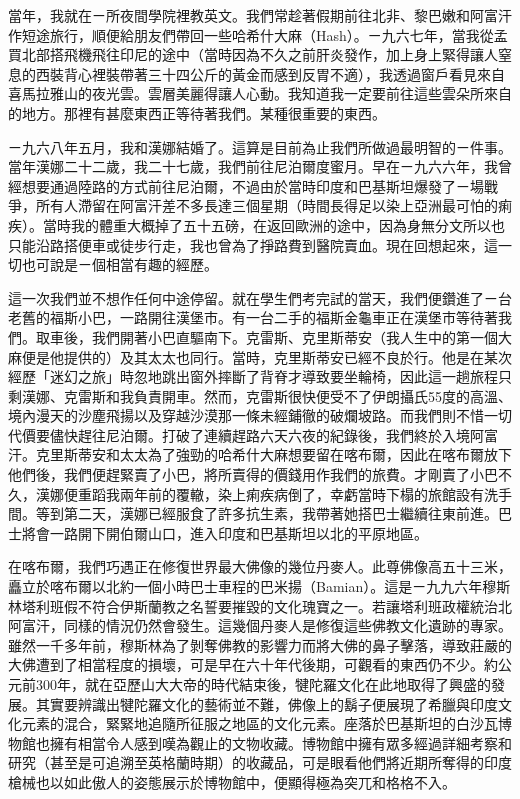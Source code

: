 當年，我就在ㄧ所夜間學院裡教英文。我們常趁著假期前往北非、黎巴嫩和阿富汗作短途旅行，順便給朋友們帶回一些哈希什大麻（Hash）。ㄧ九六七年，當我從孟買北部搭飛機飛往印尼的途中（當時因為不久之前肝炎發作，加上身上緊得讓人窒息的西裝背心裡裝帶著三十四公斤的黃金而感到反胃不適），我透過窗戶看見來自喜馬拉雅山的夜光雲。雲層美麗得讓人心動。我知道我一定要前往這些雲朵所來自的地方。那裡有甚麼東西正等待著我們。某種很重要的東西。

ㄧ九六八年五月，我和漢娜結婚了。這算是目前為止我們所做過最明智的ㄧ件事。當年漢娜二十二歲，我二十七歲，我們前往尼泊爾度蜜月。早在ㄧ九六六年，我曾經想要通過陸路的方式前往尼泊爾，不過由於當時印度和巴基斯坦爆發了ㄧ場戰爭，所有人滯留在阿富汗差不多長達三個星期（時間長得足以染上亞洲最可怕的痢疾）。當時我的體重大概掉了五十五磅，在返回歐洲的途中，因為身無分文所以也只能沿路搭便車或徒步行走，我也曾為了掙路費到醫院賣血。現在回想起來，這一切也可說是ㄧ個相當有趣的經歷。

這一次我們並不想作任何中途停留。就在學生們考完試的當天，我們便鑽進了ㄧ台老舊的福斯小巴，一路開往漢堡市。有一台二手的福斯金龜車正在漢堡市等待著我們。取車後，我們開著小巴直驅南下。克雷斯、克里斯蒂安（我人生中的第一個大麻便是他提供的）及其太太也同行。當時，克里斯蒂安已經不良於行。他是在某次經歷「迷幻之旅」時忽地跳出窗外摔斷了背脊才導致要坐輪椅，因此這一趟旅程只剩漢娜、克雷斯和我負責開車。然而，克雷斯很快便受不了伊朗攝氏55度的高溫、境內漫天的沙塵飛揚以及穿越沙漠那一條未經鋪徹的破爛坡路。而我們則不惜一切代價要儘快趕往尼泊爾。打破了連續趕路六天六夜的紀錄後，我們終於入境阿富汗。克里斯蒂安和太太為了強勁的哈希什大麻想要留在喀布爾，因此在喀布爾放下他們後，我們便趕緊賣了小巴，將所賣得的價錢用作我們的旅費。才剛賣了小巴不久，漢娜便重蹈我兩年前的覆轍，染上痢疾病倒了，幸虧當時下榻的旅館設有洗手間。等到第二天，漢娜已經服食了許多抗生素，我帶著她搭巴士繼續往東前進。巴士將會一路開下開伯爾山口，進入印度和巴基斯坦以北的平原地區。

在喀布爾，我們巧遇正在修復世界最大佛像的幾位丹麥人。此尊佛像高五十三米，矗立於喀布爾以北約一個小時巴士車程的巴米揚（Bamian）。這是ㄧ九九六年穆斯林塔利班假不符合伊斯蘭教之名誓要摧毀的文化瑰寶之一。若讓塔利班政權統治北阿富汗，同樣的情況仍然會發生。這幾個丹麥人是修復這些佛教文化遺跡的專家。雖然一千多年前，穆斯林為了剝奪佛教的影響力而將大佛的鼻子擊落，導致莊嚴的大佛遭到了相當程度的損壞，可是早在六十年代後期，可觀看的東西仍不少。約公元前300年，就在亞歷山大大帝的時代結束後，犍陀羅文化在此地取得了興盛的發展。其實要辨識出犍陀羅文化的藝術並不難，佛像上的鬍子便展現了希臘與印度文化元素的混合，緊緊地追隨所征服之地區的文化元素。座落於巴基斯坦的白沙瓦博物館也擁有相當令人感到嘆為觀止的文物收藏。博物館中擁有眾多經過詳細考察和研究（甚至是可追溯至英格蘭時期）的收藏品，可是眼看他們將近期所奪得的印度槍械也以如此傲人的姿態展示於博物館中，便顯得極為突兀和格格不入。

